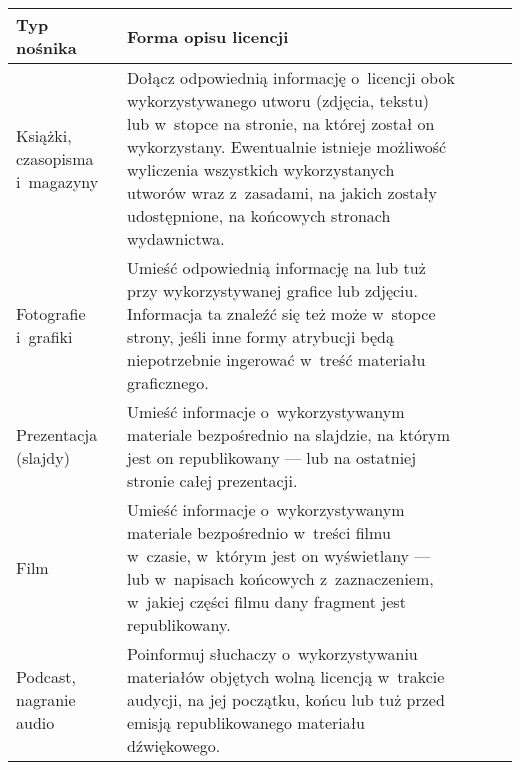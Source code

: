 \documentclass[]{wl}
\begin{document}
{
\par{} \vspace{1em} { \raggedright{}
\begin{tabularx}{\textwidth{}}{|X|X|X|X|X|}
\hline{} Typ nośnika&Forma opisu licencji\\\hline Książki, czasopisma i~magazyny&Dołącz odpowiednią informację o~licencji obok wykorzystywanego utworu (zdjęcia, tekstu) lub w~stopce na stronie, na której został on wykorzystany. Ewentualnie istnieje możliwość wyliczenia wszystkich wykorzystanych utworów wraz z~zasadami, na jakich zostały udostępnione, na końcowych stronach wydawnictwa.\\\hline
Fotografie i~grafiki&Umieść odpowiednią informację na lub tuż przy wykorzystywanej grafice lub zdjęciu. Informacja ta znaleźć się też może w~stopce strony, jeśli inne formy atrybucji będą niepotrzebnie ingerować w~treść materiału graficznego.\\\hline
Prezentacja (slajdy)&Umieść informacje o~wykorzystywanym materiale bezpośrednio na slajdzie, na którym jest on republikowany — lub na ostatniej stronie całej prezentacji.\\\hline
Film&Umieść informacje o~wykorzystywanym materiale bezpośrednio w~treści filmu w~czasie, w~którym jest on wyświetlany — lub w~napisach końcowych z~zaznaczeniem, w~jakiej części filmu dany fragment jest republikowany.\\\hline
Podcast, nagranie audio&Poinformuj słuchaczy o~wykorzystywaniu materiałów objętych wolną licencją w~trakcie audycji, na jej początku, końcu lub tuż przed emisją republikowanego materiału dźwiękowego.\\\hline
\end{tabularx}
} \vspace{1em} 
 
}
\end{document}
